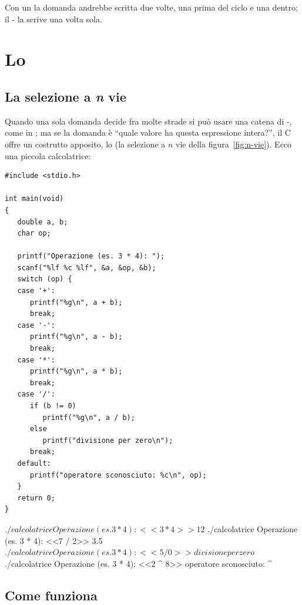 Con un  la domanda andrebbe scritta due volte, una prima del
ciclo e una dentro; il - la scrive una volta sola.

\section{Lo }

\subsection{La selezione a \textit{n} vie}

Quando una sola domanda decide fra molte strade si può usare una catena di
-, come in ; ma se la domanda è
“quale valore ha questa espressione intera?”, il C offre un costrutto
apposito, lo  (la selezione a $n$ vie della
figura~\ref{fig:n-vie}). Ecco una piccola calcolatrice:

\begin{affianco}[0.5][c]
\begin{lstlisting}[style=c, name=calcolatrice.c]
#include <stdio.h>

int main(void)
{
   double a, b;
   char op;

   printf("Operazione (es. 3 * 4): ");
   scanf("%lf %c %lf", &a, &op, &b);
   switch (op) {
   case '+':
      printf("%g\n", a + b);
      break;
   case '-':
      printf("%g\n", a - b);
      break;
   case '*':
      printf("%g\n", a * b);
      break;
   case '/':
      if (b != 0)
         printf("%g\n", a / b);
      else
         printf("divisione per zero\n");
      break;
   default:
      printf("operatore sconosciuto: %c\n", op);
   }
   return 0;
}
\end{lstlisting}
\risultato
\begin{console}
$ ./calcolatrice
Operazione (es. 3 * 4): <<3 * 4>>
12
$ ./calcolatrice
Operazione (es. 3 * 4): <<7 / 2>>
3.5
$ ./calcolatrice
Operazione (es. 3 * 4): <<5 / 0>>
divisione per zero
$ ./calcolatrice
Operazione (es. 3 * 4): <<2 ^ 8>>
operatore sconosciuto: ^
\end{console}
\vspace{2pt}
\end{affianco}

\subsection{Come funziona}

